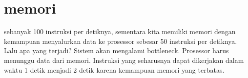 \section{memori}
sebanyak 100 instruksi per detiknya, sementara kita memiliki memori dengan kemampuan menyalurkan data ke prosessor sebesar 50 instruksi per detiknya. Lalu apa yang terjadi? Sistem akan mengalami bottleneck. Prosessor harus menunggu data dari memori. Instruksi yang seharusnya dapat dikerjakan dalam waktu 1 detik menjadi 2 detik karena kemampuan memori yang
terbatas.
